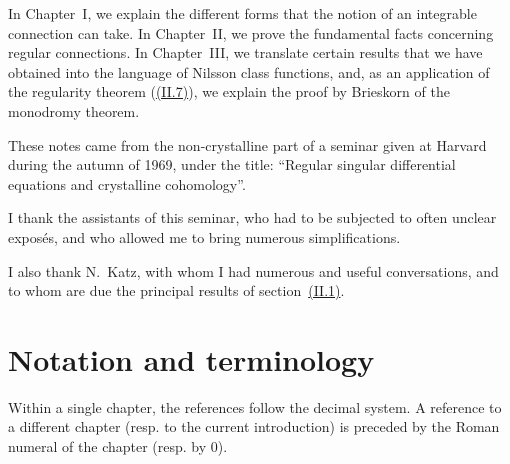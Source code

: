 \documentclass{report}
\newcommand{\oldpage}[1]{\marginpar{\footnotesize$\Big\vert$ \textit{p.~#1}}}
\begin{document}
In Chapter~I, we explain the different forms that the notion of an integrable connection can take.
In Chapter~II, we prove the fundamental facts concerning regular connections.
In Chapter~III, we translate certain results that we have obtained into the language of Nilsson class functions, and, as an application of the regularity theorem (\hyperref[II.7]{(II.7)}), we explain the proof by Brieskorn \cite{5} of the monodromy theorem.

These notes came from the non-crystalline part of a seminar given at Harvard during the autumn of 1969, under the title: ``Regular singular differential equations and crystalline cohomology''.

I thank the assistants of this seminar, who had to be subjected to often unclear expos\'{e}s, and who allowed me to bring numerous simplifications.

I also thank N.~Katz, with whom I had numerous and useful conversations, and to whom are due the principal results of section~\hyperref[II.1]{(II.1)}.


\section*{Notation and terminology}

\oldpage{2}
Within a single chapter, the references follow the decimal system.
A reference to a different chapter (resp. to the current introduction) is preceded by the Roman numeral of the chapter (resp. by 0).
\end{document}
